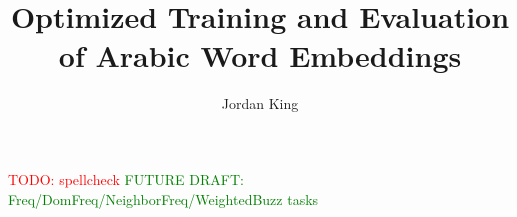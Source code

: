\documentclass[12pt]{report}
\title{Optimized Training and Evaluation of Arabic Word Embeddings}
\author{Jordan King}
\begin{document}
\maketitle   

\textcolor{red}{TODO: spellcheck}
\textcolor{green}{FUTURE DRAFT: Freq/DomFreq/NeighborFreq/WeightedBuzz tasks}



\tableofcontents
\listoffigures 
\listoftables  

\newpage
{}  %













% 

\end{document}
